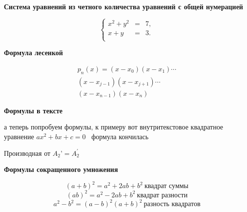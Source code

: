 \documentclass [12pt]{article}
\begin{document}
\begin {center}
  \textbf{Система уравнений из четного количества уравнений с общей нумерацией}
\end {center}

\begin{equation}\label{eq:syst}
\left\{
\begin{array}{rcl}
x^2+y^2&=&7,\\
x+y&=&3.\\
\end{array}
\right.
\end{equation}

\begin {center}
  \textbf{Формула лесенкой}
\end {center}

\begin{multline}
p_n(x) =(x - x_0)(x - x_1)
\cdots \\
(x - x_{j-1})(x - x_{j+1})
\cdots \\
(x - x_{n-1})(x - x_n)
\end{multline}

\begin {center}
  \textbf{Формулы в тексте}
\end {center}
а теперь попробуем формулы, к примеру вот внутритекстовое квадратное
уравнение $ax^2+bx+c=0$ \ формула кончилась

Производная от
\begin {math}A_2’ = A_2^\prime \end{math}

\begin {center}
  \textbf{Формулы сокращенного умножения}
\end {center}

$$
  (a+b)^2=a^2+2ab+b^2 \ \text{квадрат суммы} 
  $$
$$
  (ab)^2=a^2-2ab+b^2 \ \text{квадрат разности}
  $$
$$ 
  a^2-b^2=(a-b)^2(a+b)^2\ \text{разность квадратов}
$$
\end{document}
